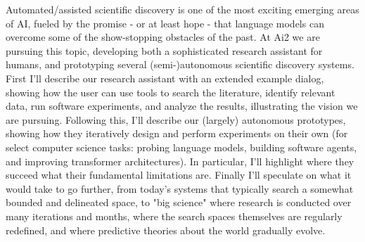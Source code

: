 Automated/assisted scientific discovery is one of the most exciting emerging areas of AI, fueled by the promise - or at least hope - that language models can overcome some of the show-stopping obstacles of the past. At Ai2 we are pursuing this topic, developing both a sophisticated research assistant for humans, and prototyping several (semi-)autonomous scientific discovery systems. First I'll describe our research assistant with an extended example dialog, showing how the user can use tools to search the literature, identify relevant data, run software experiments, and analyze the results, illustrating the vision we are pursuing. Following this, I'll describe our (largely) autonomous prototypes, showing how they iteratively design and perform experiments on their own (for select computer science tasks: probing language models, building software agents, and improving transformer architectures). In particular, I'll highlight where they succeed what their fundamental limitations are. Finally I'll speculate on what it would take to go further, from today's systems that typically search a somewhat bounded and delineated space, to "big science" where research is conducted over many iterations and months, where the search spaces themselves are regularly redefined, and where predictive theories about the world gradually evolve.